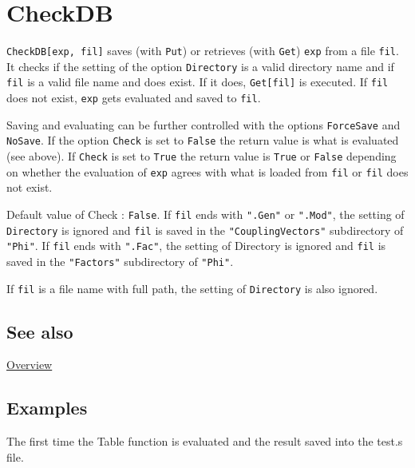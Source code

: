 \documentclass[../FeynCalcManual.tex]{subfiles}
\begin{document}
\hypertarget{checkdb}{%
\section{CheckDB}\label{checkdb}}

\texttt{CheckDB[\allowbreak{}exp,\ \allowbreak{}fil]} saves (with
\texttt{Put}) or retrieves (with \texttt{Get}) \texttt{exp} from a file
\texttt{fil}. It checks if the setting of the option \texttt{Directory}
is a valid directory name and if \texttt{fil} is a valid file name and
does exist. If it does, \texttt{Get[\allowbreak{}fil]} is executed. If
\texttt{fil} does not exist, \texttt{exp} gets evaluated and saved to
\texttt{fil}.

Saving and evaluating can be further controlled with the options
\texttt{ForceSave} and \texttt{NoSave}. If the option \texttt{Check} is
set to \texttt{False} the return value is what is evaluated (see above).
If \texttt{Check} is set to \texttt{True} the return value is
\texttt{True} or \texttt{False} depending on whether the evaluation of
\texttt{exp} agrees with what is loaded from \texttt{fil} or
\texttt{fil} does not exist.

Default value of Check : \texttt{False}. If \texttt{fil} ends with
\texttt{".Gen"} or \texttt{".Mod"}, the setting of \texttt{Directory} is
ignored and \texttt{fil} is saved in the \texttt{"CouplingVectors"}
subdirectory of \texttt{"Phi"}. If \texttt{fil} ends with
\texttt{".Fac"}, the setting of Directory is ignored and \texttt{fil} is
saved in the \texttt{"Factors"} subdirectory of \texttt{"Phi"}.

If \texttt{fil} is a file name with full path, the setting of
\texttt{Directory} is also ignored.

\subsection{See also}

\hyperlink{toc}{Overview}

\subsection{Examples}

The first time the Table function is evaluated and the result saved into
the test.s file.

\begin{Shaded}
\begin{Highlighting}[]
\OperatorTok{[}\OperatorTok{[}\OperatorTok{[}\OperatorTok{,} \OperatorTok{]}\NormalTok{; }\OperatorTok{,} \OperatorTok{\{}\OperatorTok{,} \OperatorTok{\}],} \OperatorTok{]}
\end{Highlighting}
\end{Shaded}
\end{document}
